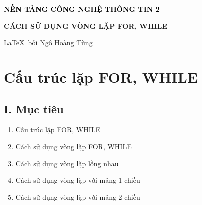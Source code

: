 

\begin{center}
    \textbf{\textcolor{black}{\large\LARGE NỀN TẢNG CÔNG NGHỆ THÔNG TIN 2}}

    \textbf{\large CÁCH SỬ DỤNG VÒNG LẶP FOR, WHILE}

    \large\LaTeX\, bởi Ngô Hoàng Tùng
\end{center}


\section*{Cấu trúc lặp FOR, WHILE}
\subsection*{\textbf{I. Mục tiêu}}
\begin{enumerate}[label=\alph*.]
    \item Cấu trúc lặp FOR, WHILE
    \item Cách sử dụng vòng lặp FOR, WHILE
    \item Cách sử dụng vòng lặp lồng nhau
    \item Cách sử dụng vòng lặp với mảng 1 chiều
    \item Cách sử dụng vòng lặp với mảng 2 chiều
\end{enumerate}
